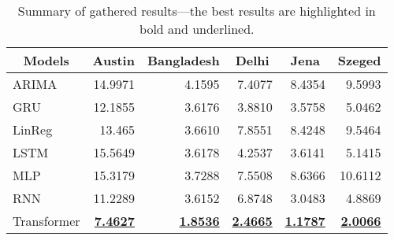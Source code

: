 \begin{table*}[t]
    \centering
    \caption {Summary of gathered results---the best results are highlighted in bold and underlined.} \label{tab:ResultsTable} 
    \begin{tabular}{|l|r|r|r|r|r|}
    \hline
    \multicolumn{1}{|c|}{Models} & \multicolumn{1}{c|}{Austin} & \multicolumn{1}{c|}{Bangladesh} & \multicolumn{1}{c|}{Delhi} & \multicolumn{1}{c|}{Jena} & \multicolumn{1}{c|}{Szeged} \\ \hline
    ARIMA                        & 14.9971                     & 4.1595                          & 7.4077                     & 8.4354                    & 9.5993                      \\ \hline
    GRU                          & 12.1855                     & 3.6176                          & 3.8810                     & 3.5758                    & 5.0462                      \\ \hline
    LinReg                       & 13.465                      & 3.6610                          & 7.8551                     & 8.4248                    & 9.5464                      \\ \hline
    LSTM                         & 15.5649                     & 3.6178                          & 4.2537                     & 3.6141                    & 5.1415                      \\ \hline
    MLP                          & 15.3179                     & 3.7288                          & 7.5508                     & 8.6366                    & 10.6112                     \\ \hline
    RNN                          & 11.2289                     & 3.6152                          & 6.8748                     & 3.0483                    & 4.8869                      \\ \hline
    Transformer                  & {\ul{\textbf{7.4627}}}      & {\ul{\textbf{1.8536}}}          & {\ul{\textbf{2.4665}}}     & {\ul{\textbf{1.1787}}}    & {\ul{\textbf{2.0066}}}      \\ \hline
    \end{tabular}
\end{table*}

